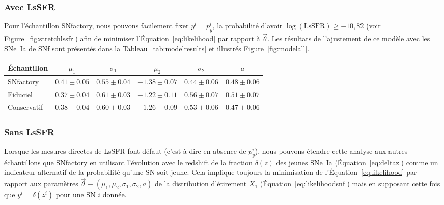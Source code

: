 \documentclass[../main/main.tex]{subfiles}
\begin{document}
\subsubsection*{Avec LsSFR}\label{sssec:lssfr}

Pour l'échantillon SNfactory, nous pouvons facilement fixer $y^i = p_y^i$, la
probabilité d'avoir $\log(\mathrm{LsSFR}) \geq -10,82$ (voir
Figure~\ref{fig:stretchlssfr}) afin de minimiser l'Équation~\ref{eq:likelihood}
par rapport à $\overrightarrow{\theta}$. Les résultats de l'ajustement de ce
modèle avec les SNe~Ia de SNf sont présentés dans la
Tableau~\ref{tab:modelresults} et illustrés Figure~\ref{fig:modelall}.

\begin{table*}
    \centering
    \caption[Valeurs des paramètres du modèle d'étirement de référence selon
    l'échantillon.]{Valeurs des paramètres issus des meilleurs ajustements du
        modèle de distribution de l'étirement de référence lorsqu'il est
        appliqué à l'ensemble de données de SNfactory seulement (114 SNe~Ia), à
        l'échantillon fiduciel (569 SNe~Ia) ou à l'échantillon conservatif
    (422).}
    \label{tab:modelresults}
    \begin{tabular}{lccccc}
        \toprule
        Échantillon & $\mu_1$             & $\sigma_1$
                    & $\mu_2$             & $\sigma_2$
                    & $a$ \\
        \midrule
        SNfactory   & $ 0.41 \pm 0.05$    & $0.55 \pm 0.04$
                    & $-1.38 \pm 0.07$    & $0.44 \pm 0.06$
                    & $ 0.48 \pm 0.06$ \\
        Fiduciel    & $ 0.37 \pm 0.04$    & $0.61 \pm 0.03$
                    & $-1.22 \pm 0.11$    & $0.56 \pm 0.07$
                    & $ 0.51 \pm 0.07$ \\
        Conservatif & $ 0.38 \pm 0.04$    & $0.60 \pm 0.03$
                    & $-1.26 \pm 0.09$    & $0.53 \pm 0.06$
                    & $ 0.47 \pm 0.06$ \\
        \bottomrule
    \end{tabular}
\end{table*}

\subsubsection*{Sans LsSFR}\label{sssec:z}

Lorsque les mesures directes de LsSFR font défaut (c'est-à-dire en absence de
$p_y^i$), nous pouvons étendre cette analyse aux autres échantillons que
SNfactory en utilisant l'évolution avec le redshift de la fraction $\delta(z)$
des jeunes SNe~Ia (Équation~\ref{eq:deltaz}) comme un indicateur alternatif de
la probabilité qu'une SN soit jeune. Cela implique toujours la minimisation de
l'Équation~\ref{eq:likelihood} par rapport aux paramètres 
$\overrightarrow{\theta}\equiv(\mu_1, \mu_2, \sigma_1, \sigma_2, a)$ de la
distribution d'étirement $X_1$ (Équation~\ref{eq:likelihoodsnf}) mais en
supposant cette fois que $y^i = \delta(z^i)$ pour une SN $i$ donnée.
\end{document}
